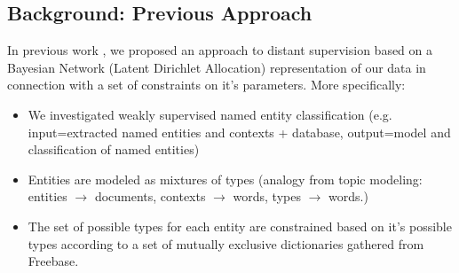 \documentclass[12pt]{article}
\begin{document}
\subsection{Background: Previous Approach}
In previous work \citep{Ritter11}, we proposed an approach to distant supervision based on a Bayesian Network (Latent Dirichlet Allocation) representation of our data
in connection with a set of constraints on it's parameters.  More specifically:
\begin{itemize}
  \item We investigated weakly supervised named entity classification (e.g. input=extracted named entities and contexts + database, output=model and classification of named entities)
  \item Entities are modeled as mixtures of types (analogy from topic modeling: entities $\rightarrow$ documents, contexts $\rightarrow$ words, types $\rightarrow$ words.)
  \item The set of possible types for each entity are constrained based on it's possible types according to a set of mutually exclusive dictionaries gathered from Freebase.
\end{itemize}
\end{document}
